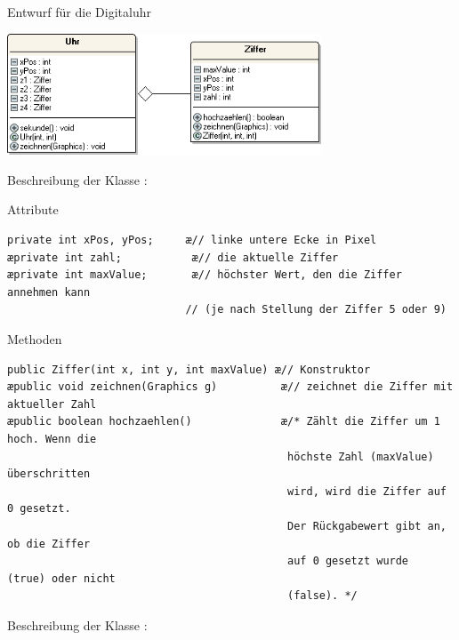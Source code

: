Entwurf für die Digitaluhr

\begin{minipage}{1.0\textwidth}
\begin{center}
\includegraphics[width=0.7\textwidth]{./inf/SEKII/12_Java_Datenkapselung/digitaluhrUML.png}
\end{center}
\end{minipage}

\vspace{10mm}

Beschreibung der Klasse :

\begin{compactenum}[a)]
\item Attribute

\begin{lstlisting}
private int xPos, yPos;     æ// linke untere Ecke in Pixel
æprivate int zahl;           æ// die aktuelle Ziffer
æprivate int maxValue;       æ// höchster Wert, den die Ziffer annehmen kann
                            // (je nach Stellung der Ziffer 5 oder 9)
\end{lstlisting}

\item Methoden

\begin{lstlisting}
public Ziffer(int x, int y, int maxValue) æ// Konstruktor
æpublic void zeichnen(Graphics g)          æ// zeichnet die Ziffer mit aktueller Zahl
æpublic boolean hochzaehlen()              æ/* Zählt die Ziffer um 1 hoch. Wenn die                                            
                                            höchste Zahl (maxValue) überschritten
                                            wird, wird die Ziffer auf 0 gesetzt.
                                            Der Rückgabewert gibt an, ob die Ziffer
                                            auf 0 gesetzt wurde  (true) oder nicht 
                                            (false). */
\end{lstlisting}
\end{compactenum}

Beschreibung der Klasse :

